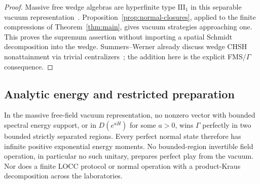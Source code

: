 \begin{proof}
Massive free wedge algebras are hyperfinite type $\mathrm{III}_1$ in this separable vacuum representation~\cite{BDF87,Haagerup}. Proposition~\ref{prop:normal-closures}, applied to the finite compressions of Theorem~\ref{thm:main}, gives vacuum strategies approaching one. This proves the supremum assertion without importing a spatial Schmidt decomposition into the wedge. Summers--Werner already discuss wedge CHSH nonattainment via trivial centralizers~\cite[p. 221]{SW88}; the addition here is the explicit FMS/$\Gamma$ consequence.
\end{proof}

\subsection{Analytic energy and restricted preparation}
\begin{theorem}\label{thm:preparation-obstruction}
In the massive free-field vacuum representation, no nonzero vector with bounded spectral energy support, or in $D(e^{aH})$ for some $a>0$, wins $\Gamma$ perfectly in two bounded strictly separated regions. Every perfect normal state therefore has infinite positive exponential energy moments. No bounded-region invertible field operation, in particular no such unitary, prepares perfect play from the vacuum. Nor does a finite LOCC protocol or normal operation with a product-Kraus decomposition across the laboratories.
\end{theorem}

